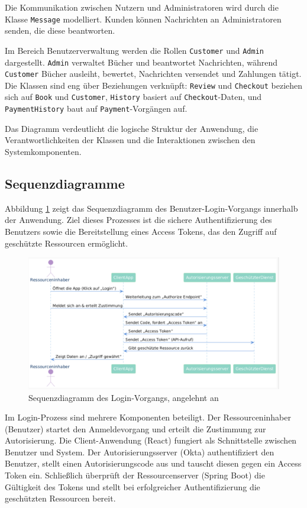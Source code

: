 \noindent Die Kommunikation zwischen Nutzern und Administratoren wird durch die Klasse \texttt{Message} modelliert. Kunden können Nachrichten an Administratoren senden, die diese beantworten.

\noindent Im Bereich Benutzerverwaltung werden die Rollen \texttt{Customer} und \texttt{Admin} dargestellt. \texttt{Admin} verwaltet Bücher und beantwortet Nachrichten, während \texttt{Customer} Bücher ausleiht, bewertet, Nachrichten versendet und Zahlungen tätigt. Die Klassen sind eng über Beziehungen verknüpft: \texttt{Review} und \texttt{Checkout} beziehen sich auf \texttt{Book} und \texttt{Customer}, \texttt{History} basiert auf \texttt{Checkout}-Daten, und \texttt{PaymentHistory} baut auf \texttt{Payment}-Vorgängen auf.

\noindent Das Diagramm verdeutlicht die logische Struktur der Anwendung, die Verantwortlichkeiten der Klassen und die Interaktionen zwischen den Systemkomponenten.

\subsection{Sequenzdiagramme}

Abbildung \ref{fig:Sequence-Diagram} zeigt das Sequenzdiagramm des Benutzer-Login-Vorgangs innerhalb der Anwendung. Ziel dieses Prozesses ist die sichere Authentifizierung des Benutzers sowie die Bereitstellung eines Access Tokens, das den Zugriff auf geschützte Ressourcen ermöglicht.

\begin{figure}[H]
	\centering
	\includegraphics[width=\textwidth]{images/SequenceDiagram.jpg}
	\caption{Sequenzdiagramm des Login-Vorgangs, angelehnt an \cite{OKTALOGIN2025}}
	\label{fig:Sequence-Diagram} 
\end{figure} 

\noindent Im Login-Prozess sind mehrere Komponenten beteiligt. Der Ressourceninhaber (Benutzer) startet den Anmeldevorgang und erteilt die Zustimmung zur Autorisierung. Die Client-Anwendung (React) fungiert als Schnittstelle zwischen Benutzer und System. Der Autorisierungsserver (Okta) authentifiziert den Benutzer, stellt einen Autorisierungscode aus und tauscht diesen gegen ein Access Token ein. Schließlich überprüft der Ressourcenserver (Spring Boot) die Gültigkeit des Tokens und stellt bei erfolgreicher Authentifizierung die geschützten Ressourcen bereit.


